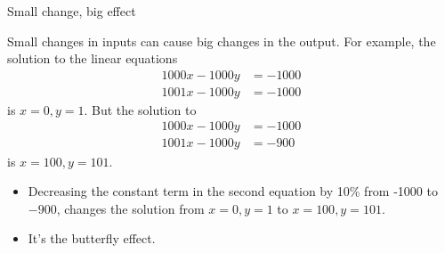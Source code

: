 \documentclass[usenames,dvipsnames,fleqn]{beamer}
\author[BW]{BW}
\theoremstyle{definition}
\begin{document}
\begin{frame}{Small change, big effect}


Small changes in inputs can cause big changes in the output. For example, the 
solution to the linear equations
\begin{align*}
    1000 x - 1000 y &= -1000\\
   1001 x - 1000 y &= -1000
\end{align*}
is \(x = 0, y = 1 \).  But the solution to
\begin{align*}
    1000 x - 1000 y &= -1000 \\
   1001 x - 1000 y &= -900
\end{align*}
is \(x=100,y=101\). 


\begin{itemize}

\item  Decreasing the constant term in the second equation by 10\% from -1000 to  \(-900\), 
changes the solution from \(x=0,y=1\) to 
 \(x=100,y=101\). 
 
 \item It's the butterfly effect.
\end{itemize}

\end{frame}
\end{document}
